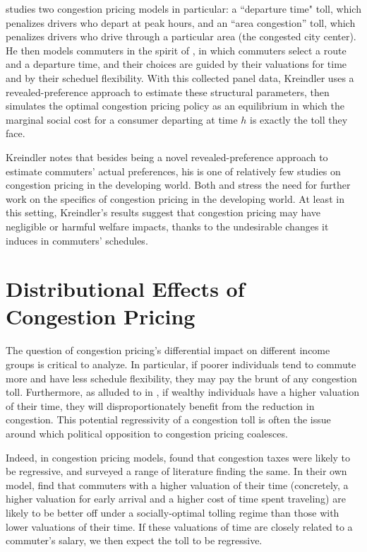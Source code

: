 \documentclass[JEL]{AEA}
\begin{document}
\cite{kreindler-2018} studies two congestion pricing models in particular: a ``departure time" toll, which penalizes drivers who depart at peak hours, and an ``area congestion'' toll, which penalizes drivers who drive through a particular area (the congested city center). He then models commuters in the spirit of \cite{arnott-1994}, in which commuters select a route and a departure time, and their choices are guided by their valuations for time and by their scheduel flexibility. With this collected panel data, Kreindler uses a revealed-preference approach to estimate these structural parameters, then simulates the optimal congestion pricing policy as an equilibrium in which the marginal social cost for a consumer departing at time $h$ is exactly the toll they face.

Kreindler notes that besides being a novel revealed-preference approach to estimate commuters' actual preferences, his is one of relatively few studies on congestion pricing in the developing world. Both \cite{kreindler-2018} and \cite{bryan-2020} stress the need for further work on the specifics of congestion pricing in the developing world. At least in this setting, Kreindler's results suggest that congestion pricing may have negligible or harmful welfare impacts, thanks to the undesirable changes it induces in commuters' schedules.

\section{Distributional Effects of Congestion Pricing}
\label{distributional-effects}

The question of congestion pricing's differential impact on different income groups is critical to analyze. In particular, if poorer individuals tend to commute more and have less schedule flexibility, they may pay the brunt of any congestion toll. Furthermore, as alluded to in \cite{arnott-1994}, if wealthy individuals have a higher valuation of their time, they will disproportionately benefit from the reduction in congestion. This potential regressivity of a congestion toll is often the issue around which political opposition to congestion pricing coalesces.

Indeed, in congestion pricing models, \cite{arnott-1994} found that congestion taxes were likely to be regressive, and surveyed a range of literature finding the same. In their own model, \cite{arnott-1994} find that commuters with a higher valuation of their time (concretely, a higher valuation for early arrival and a higher cost of time spent traveling) are likely to be better off under a socially-optimal tolling regime than those with lower valuations of their time. If these valuations of time are closely related to a commuter's salary, we then expect the toll to be regressive.
\end{document}
